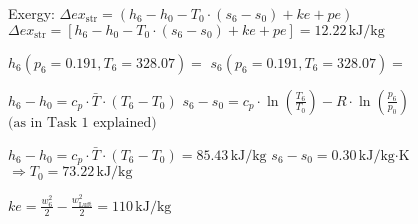 Exergy:  
\( \Delta ex_{\text{str}} = (h_6 - h_0 - T_0 \cdot (s_6 - s_0) + ke + pe) \)  
\( \Delta ex_{\text{str}} = [h_6 - h_0 - T_0 \cdot (s_6 - s_0) + ke + pe] = 12.22 \, \text{kJ/kg} \)  

\( h_6 (p_6 = 0.191, T_6 = 328.07) = \)  
\( s_6 (p_6 = 0.191, T_6 = 328.07) = \)  

\( h_6 - h_0 = c_p \cdot \bar{T} \cdot (T_6 - T_0) \)  
\( s_6 - s_0 = c_p \cdot \ln \left( \frac{T_6}{T_0} \right) - R \cdot \ln \left( \frac{p_6}{p_0} \right) \)  
\( \text{(as in Task 1 explained)} \)  

\( h_6 - h_0 = c_p \cdot \bar{T} \cdot (T_6 - T_0) = 85.43 \, \text{kJ/kg} \)  
\( s_6 - s_0 = 0.30 \, \text{kJ/kg·K} \)  
\( \Rightarrow T_0 = 73.22 \, \text{kJ/kg} \)  

\( ke = \frac{w_6^2}{2} - \frac{w_{\text{Luft}}^2}{2} = 110 \, \text{kJ/kg} \)